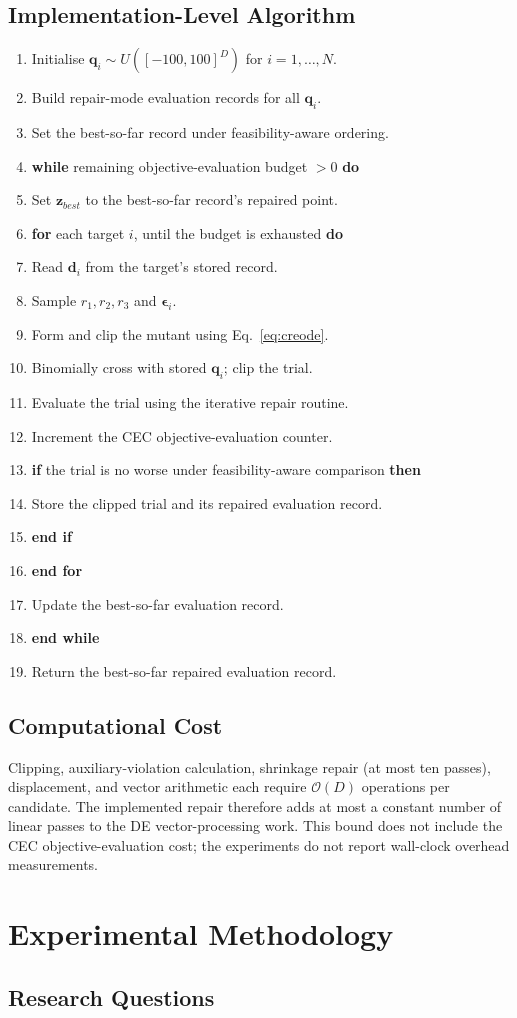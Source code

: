 \documentclass[a4paper,fleqn]{cas-sc}
\newenvironment{algorithmic}[1][]{%
  \begin{enumerate}
  \setlength{\itemsep}{0pt}
  \setlength{\parsep}{0pt}
  \setlength{\topsep}{2pt}
  \renewcommand{\labelenumi}{\arabic{enumi}.}%
}{\end{enumerate}}
\newcommand{\STATE}{\item}
\newcommand{\WHILE}[1]{\item \textbf{while} #1 \textbf{do}}
\newcommand{\ENDWHILE}{\item[] \textbf{end while}}
\newcommand{\FOR}[1]{\item \textbf{for} #1 \textbf{do}}
\newcommand{\ENDFOR}{\item[] \textbf{end for}}
\newcommand{\IF}[1]{\item \textbf{if} #1 \textbf{then}}
\newcommand{\ENDIF}{\item[] \textbf{end if}}
\begin{document}
\subsection{Implementation-Level Algorithm}

\begin{algorithm}[H]
\caption{CREO-DE as implemented in the CEC2017 scripts}
\label{alg:creode}
\begin{algorithmic}[1]
\STATE Initialise $\mathbf{q}_i\sim U([-100,100]^D)$ for $i=1,\ldots,N$.
\STATE Build repair-mode evaluation records for all $\mathbf{q}_i$.
\STATE Set the best-so-far record under feasibility-aware ordering.
\WHILE{remaining objective-evaluation budget $>0$}
  \STATE Set $\mathbf{z}_{best}$ to the best-so-far record's repaired point.
  \FOR{each target $i$, until the budget is exhausted}
    \STATE Read $\mathbf{d}_i$ from the target's stored record.
    \STATE Sample $r_1,r_2,r_3$ and $\boldsymbol{\epsilon}_i$.
    \STATE Form and clip the mutant using Eq.~\eqref{eq:creode}.
    \STATE Binomially cross with stored $\mathbf{q}_i$; clip the trial.
    \STATE Evaluate the trial using the iterative repair routine.
    \STATE Increment the CEC objective-evaluation counter.
    \IF{the trial is no worse under feasibility-aware comparison}
      \STATE Store the clipped trial and its repaired evaluation record.
    \ENDIF
  \ENDFOR
  \STATE Update the best-so-far evaluation record.
\ENDWHILE
\STATE Return the best-so-far repaired evaluation record.
\end{algorithmic}
\end{algorithm}

\subsection{Computational Cost}

Clipping, auxiliary-violation calculation, shrinkage repair (at most ten passes), displacement, and vector arithmetic each require $\mathcal{O}(D)$ operations per candidate. The implemented repair therefore adds at most a constant number of linear passes to the DE vector-processing work. This bound does not include the CEC objective-evaluation cost; the experiments do not report wall-clock overhead measurements.

\section{Experimental Methodology}

\subsection{Research Questions}
\end{document}
